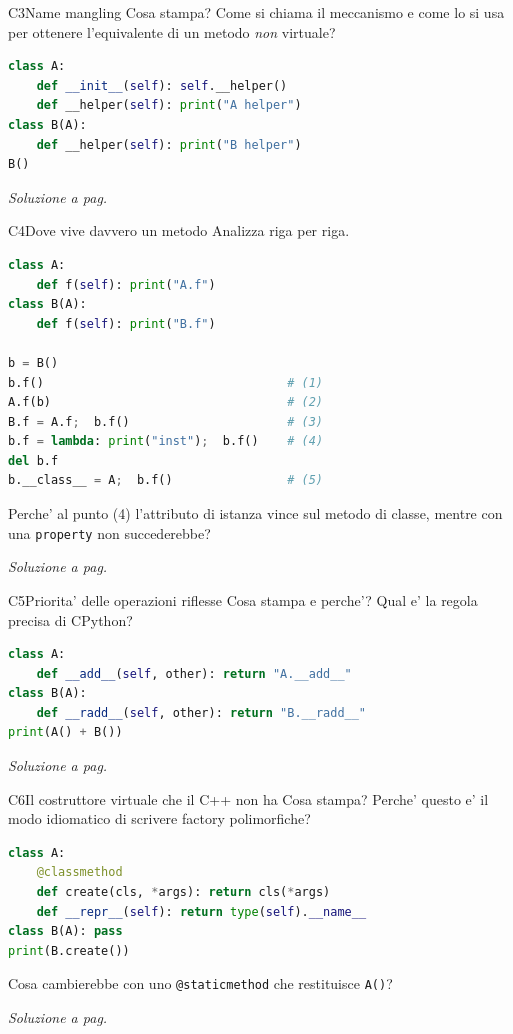 \documentclass{report}
\newcommand{\code}[1]{\texttt{\small #1}}
\newcommand{\vaisol}[1]{%
    \par\vspace{4pt}\hfill{\footnotesize\itshape\color{gray}%
    Soluzione a pag.~\pageref{sol:#1}}%
}
\begin{document}
\begin{domanda}{C3}{Name mangling}
Cosa stampa? Come si chiama il meccanismo e come lo si usa per ottenere
l'equivalente di un metodo \emph{non} virtuale?
\begin{lstlisting}[language=Python]
class A:
    def __init__(self): self.__helper()
    def __helper(self): print("A helper")
class B(A):
    def __helper(self): print("B helper")
B()
\end{lstlisting}
\vaisol{C3}
\end{domanda}

\begin{domanda}{C4}{Dove vive davvero un metodo}
Analizza riga per riga.
\begin{lstlisting}[language=Python]
class A:
    def f(self): print("A.f")
class B(A):
    def f(self): print("B.f")

b = B()
b.f()                                  # (1)
A.f(b)                                 # (2)
B.f = A.f;  b.f()                      # (3)
b.f = lambda: print("inst");  b.f()    # (4)
del b.f
b.__class__ = A;  b.f()                # (5)
\end{lstlisting}
Perche' al punto (4) l'attributo di istanza vince sul metodo di classe, mentre
con una \code{property} non succederebbe?
\vaisol{C4}
\end{domanda}

\begin{domanda}{C5}{Priorita' delle operazioni riflesse}
Cosa stampa e perche'? Qual e' la regola precisa di CPython?
\begin{lstlisting}[language=Python]
class A:
    def __add__(self, other): return "A.__add__"
class B(A):
    def __radd__(self, other): return "B.__radd__"
print(A() + B())
\end{lstlisting}
\vaisol{C5}
\end{domanda}

\begin{domanda}{C6}{Il costruttore virtuale che il C++ non ha}
Cosa stampa? Perche' questo e' il modo idiomatico di scrivere factory
polimorfiche?
\begin{lstlisting}[language=Python]
class A:
    @classmethod
    def create(cls, *args): return cls(*args)
    def __repr__(self): return type(self).__name__
class B(A): pass
print(B.create())
\end{lstlisting}
Cosa cambierebbe con uno \code{@staticmethod} che restituisce \code{A()}?
\vaisol{C6}
\end{domanda}
\end{document}
